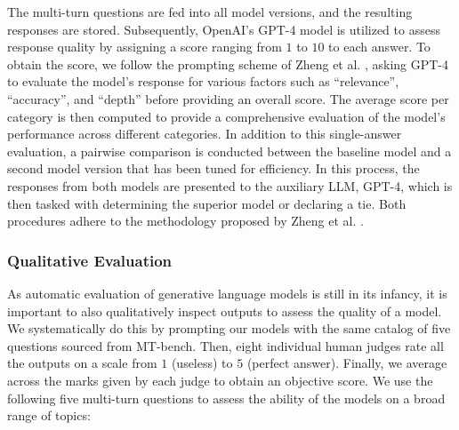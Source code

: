 \documentclass[conference]{IEEEtran}
\begin{document}
The multi-turn questions are fed into all model versions, and the resulting responses are stored. Subsequently, OpenAI's GPT-4 model is utilized to assess response quality by assigning a score ranging from $1$ to $10$ to each answer.
To obtain the score, we follow the prompting scheme of Zheng et al. \cite{zheng_judging_2023}, asking GPT-4 to evaluate the model's response for various factors such as ``relevance'', ``accuracy'', and ``depth'' before providing an overall score.
The average score per category is then computed to provide a comprehensive evaluation of the model's performance across different categories. In addition to this single-answer evaluation, a pairwise comparison is conducted between the baseline model and a second model version that has been tuned for efficiency. In this process, the responses from both models are presented to the auxiliary LLM, GPT-4, which is then tasked with determining the superior model or declaring a tie.
Both procedures adhere to the methodology proposed by Zheng et al. \cite{zheng_judging_2023}.

\subsubsection{Qualitative Evaluation}
\label{sec:quali_eval}
As automatic evaluation of generative language models is still in its infancy, it is important to also qualitatively inspect outputs to assess the quality of a model. We systematically do this by prompting our models with the same catalog of five questions sourced from MT-bench. Then, eight individual human judges rate all the outputs on a scale from $1$ (useless) to $5$ (perfect answer). Finally, we average across the marks given by each judge to obtain an objective score. We use the following five multi-turn questions to assess the ability of the models on a broad range of topics:
\end{document}
